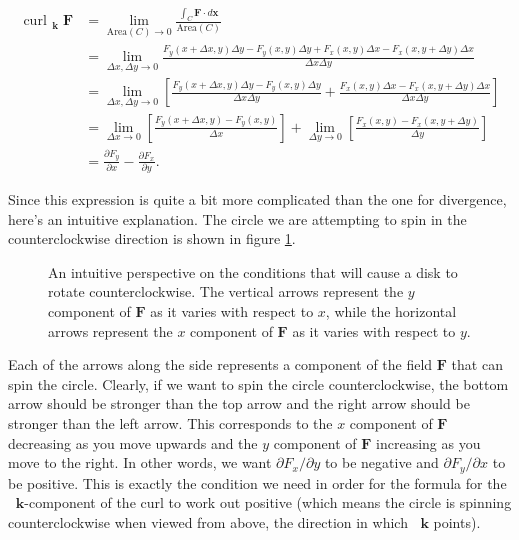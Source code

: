 \documentclass{myarticle}
\DeclareMathOperator{\curls}{curl}
\renewcommand{\vec}[1]{\mathbf{#1}}
\newcommand{\unitvector}[1]{
  \mathop{}\!\vec{#1}
}
\newcommand{\kh}{\unitvector{k}}
\theoremstyle{nospace}
\newtheorem{old series theorem}{Theorem}
\newenvironment{series theorem}
{\begin{mdframed}\begin{old series theorem}}
    {\end{old series theorem}\end{mdframed}}
\begin{document}
\begin{align*}
  \curls_{\kh} \vec{F}
  &= \lim_{\text{Area}(C) \to 0}
    \frac{\int_C \vec{F} \cdot d\vec{x}}{\text{Area}(C)} \\
  &= \lim_{\Delta x, \Delta y \to 0}
    \frac{
    F_y(x + \Delta x, y)\Delta y -
    F_y(x, y)\Delta y +
    F_x(x, y)\Delta x -
    F_x(x, y + \Delta y)\Delta x}
    {\Delta x \Delta y} \\
  &= \lim_{\Delta x, \Delta y \to 0}
    \left[\frac{
    F_y(x + \Delta x, y)\Delta y -
    F_y(x, y)\Delta y}{\Delta x \Delta y} +
    \frac{F_x(x, y)\Delta x -
    F_x(x, y + \Delta y)\Delta x}
    {\Delta x \Delta y}\right] \\
  &= \lim_{\Delta x \to 0}
    \left[\frac{
    F_y(x + \Delta x, y) -
    F_y(x, y)}{\Delta x}\right]
    + \lim_{\Delta y \to 0}
    \left[\frac{
    F_x(x, y) -
    F_x(x, y + \Delta y)}
    {\Delta y}\right] \\
  &= \frac{\partial F_y}{\partial x}
    - \frac{\partial F_x}{\partial y}.
\end{align*}

Since this expression is quite a bit more complicated than the one for
divergence, here's an intuitive explanation. The circle we are
attempting to spin in the counterclockwise direction is shown in
figure \ref{fig:circle spin}.

\begin{figure}[htb!] \centering
  \caption{An intuitive perspective on the conditions that will cause
    a disk to rotate counterclockwise. The vertical arrows represent
    the $y$ component of $\vec{F}$ as it varies with respect to $x$,
    while the horizontal arrows represent the $x$ component of
    $\vec{F}$ as it varies with respect to $y$.}
  \label{fig:circle spin}
\end{figure}

Each of the arrows along the side represents a component of the field
$\vec{F}$ that can spin the circle. Clearly, if we want to spin the
circle counterclockwise, the bottom arrow should be stronger than the
top arrow and the right arrow should be stronger than the left arrow.
This corresponds to the $x$ component of $\vec{F}$ decreasing as you
move upwards and the $y$ component of $\vec{F}$ increasing as you move
to the right. In other words, we want $\partial F_x/\partial y$ to be
negative and $\partial F_y/\partial x$ to be positive. This is exactly
the condition we need in order for the formula for the $\kh$-component
of the curl to work out positive (which means the circle is spinning
counterclockwise when viewed from above, the direction in which $\kh$
points).
\end{document}
